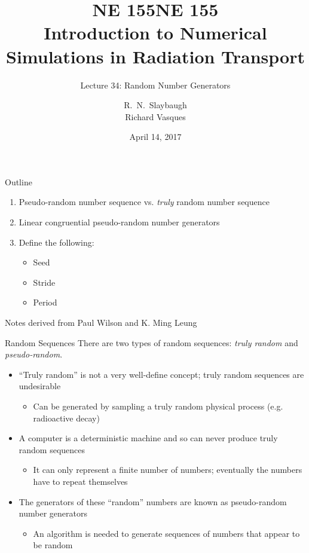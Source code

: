 \documentclass[xcolor=x11names,compress]{beamer}
\title{NE 155}
\author{R.\ N.\ Slaybaugh \\
Richard Vasques}
\date{April 14, 2017}
\renewcommand{\(}{\begin{columns}}
\renewcommand{\)}{\end{columns}}
\newcommand{\<}[1]{\begin{column}{#1}}
\renewcommand{\>}{\end{column}}
\begin{document}
\begin{frame}
\title{NE 155\\Introduction to Numerical Simulations in Radiation Transport}
\subtitle{Lecture 34: Random Number Generators}
\titlepage
\end{frame}


\begin{frame}{Outline}

    \begin{enumerate}
    \item Pseudo-random number sequence vs. \textit{truly} random number sequence
    \item Linear congruential pseudo-random number generators
    \item Define the following:
      \begin{itemize}
      \item Seed
      \item Stride
      \item Period
      \end{itemize}
    \end{enumerate}

\vspace*{1em}
Notes derived from Paul Wilson and K. Ming Leung
\end{frame}

\begin{frame}{Random Sequences}
There are two types of random sequences: \textit{truly random} and \textit{pseudo-random}.
\begin{itemize}
\item ``Truly random'' is not a very well-define concept; truly random sequences are undesirable
\begin{itemize}
\item Can be generated by sampling a truly random physical process (e.g. radioactive decay)
\end{itemize}
\item A computer is a deterministic machine and so can never produce truly random sequences
\begin{itemize}
\item It can only represent a finite number of numbers; eventually the numbers have to repeat themselves
\end{itemize}
\item The generators of these ``random'' numbers are known as pseudo-random number generators
\begin{itemize}
\item An algorithm is needed to generate sequences of numbers that appear to be random
\end{itemize}
\end{itemize}

\end{frame}
\end{document}
